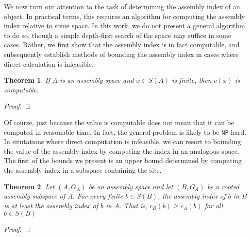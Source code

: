 \documentclass[aps,prd,onecolumn,nofootinbib,letterpaper,preprintnumbers,superscriptaddress,eqsecnum]{revtex4}
\newtheorem{theorem}{Theorem}
\theoremstyle{definition}
\newcommand{\red}[1]{{\color{red}#1}}
\newcommand{\TODO}[1]{\noindent\red{\textbf{TODO:}~#1}}
\begin{document}
We now turn our attention to the task of determining the assembly index of an object.
In practical terms, this requires an algorithm for computing the assembly index relative to some space.
In this work, we do not present a general algorithm to do so, though a simple depth-first search of the space may suffice in some cases.
Rather, we first show that the assembly index is in fact computable, and subsequently establish methods of bounding the assembly index in cases where direct calculation is infeasible.
\begin{theorem}\label{thm:computable}
    If $A$ is an assembly space and $x \in S(A)$ is finite, then $c(x)$ is computable.
\end{theorem}
\begin{proof}
    \TODO{Complete}
\end{proof}
Of course, just because the value is computable does not mean that it can be computed in reasonable time.
In fact, the general problem is likely to be \texttt{NP}-hard.
In situtations where direct computation is infeasible, we can resort to bounding the value of the assembly index by computing the index in an analogous space.
The first of the bounds we present is an upper bound determined by computing the assembly index in a subspace containing the site.
\begin{theorem}\label{thm:subspace-index-upper-bound}
    Let $(A, G_A)$ be an assembly space and let $(B, G_A)$ be a rooted assembly subspace of $A$.
    For every finite $b \in S(B)$, the assembly index of $b$ in $B$ is at least the assembly index of $b$ in $A$.
    That is, $c_B(b) \ge c_A(b)$ for all $b \in S(B)$
\end{theorem}
\begin{proof}
    \TODO{Complete}
\end{proof}
\end{document}
